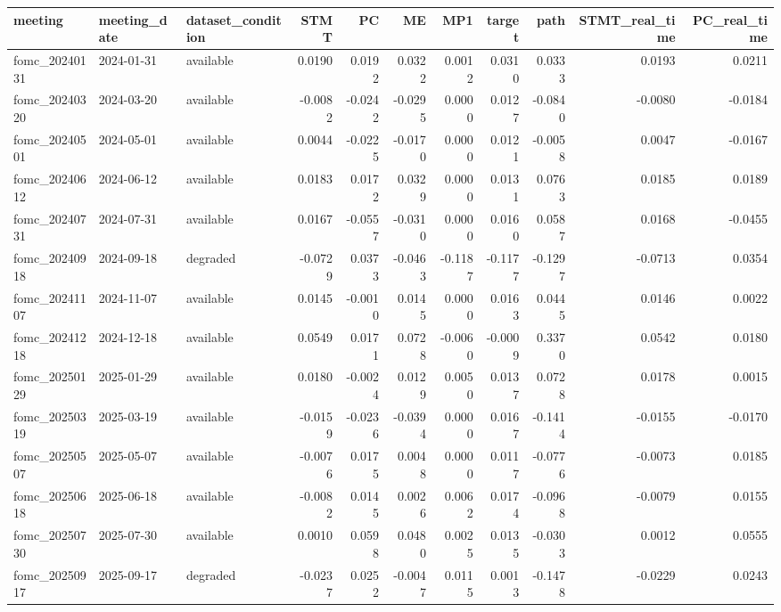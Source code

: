 \begin{tabular}{lllrrrrrrrr}
\toprule
meeting & meeting_date & dataset_condition & STMT & PC & ME & MP1 & target & path & STMT_real_time & PC_real_time \\
\midrule
fomc_20240131 & 2024-01-31 & available & 0.0190 & 0.0192 & 0.0322 & 0.0012 & 0.0310 & 0.0333 & 0.0193 & 0.0211 \\
fomc_20240320 & 2024-03-20 & available & -0.0082 & -0.0242 & -0.0295 & 0.0000 & 0.0127 & -0.0840 & -0.0080 & -0.0184 \\
fomc_20240501 & 2024-05-01 & available & 0.0044 & -0.0225 & -0.0170 & 0.0000 & 0.0121 & -0.0058 & 0.0047 & -0.0167 \\
fomc_20240612 & 2024-06-12 & available & 0.0183 & 0.0172 & 0.0329 & 0.0000 & 0.0131 & 0.0763 & 0.0185 & 0.0189 \\
fomc_20240731 & 2024-07-31 & available & 0.0167 & -0.0557 & -0.0310 & 0.0000 & 0.0160 & 0.0587 & 0.0168 & -0.0455 \\
fomc_20240918 & 2024-09-18 & degraded & -0.0729 & 0.0373 & -0.0463 & -0.1187 & -0.1177 & -0.1297 & -0.0713 & 0.0354 \\
fomc_20241107 & 2024-11-07 & available & 0.0145 & -0.0010 & 0.0145 & 0.0000 & 0.0163 & 0.0445 & 0.0146 & 0.0022 \\
fomc_20241218 & 2024-12-18 & available & 0.0549 & 0.0171 & 0.0728 & -0.0060 & -0.0009 & 0.3370 & 0.0542 & 0.0180 \\
fomc_20250129 & 2025-01-29 & available & 0.0180 & -0.0024 & 0.0129 & 0.0050 & 0.0137 & 0.0728 & 0.0178 & 0.0015 \\
fomc_20250319 & 2025-03-19 & available & -0.0159 & -0.0236 & -0.0394 & 0.0000 & 0.0167 & -0.1414 & -0.0155 & -0.0170 \\
fomc_20250507 & 2025-05-07 & available & -0.0076 & 0.0175 & 0.0048 & 0.0000 & 0.0117 & -0.0776 & -0.0073 & 0.0185 \\
fomc_20250618 & 2025-06-18 & available & -0.0082 & 0.0145 & 0.0026 & 0.0062 & 0.0174 & -0.0968 & -0.0079 & 0.0155 \\
fomc_20250730 & 2025-07-30 & available & 0.0010 & 0.0598 & 0.0480 & 0.0025 & 0.0135 & -0.0303 & 0.0012 & 0.0555 \\
fomc_20250917 & 2025-09-17 & degraded & -0.0237 & 0.0252 & -0.0047 & 0.0115 & 0.0013 & -0.1478 & -0.0229 & 0.0243 \\
\bottomrule
\end{tabular}
